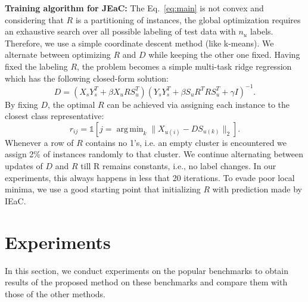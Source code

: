 \documentclass[letterpaper]{article}
\DeclareMathOperator*{\argmin}{arg\,min}
\begin{document}
\textbf{Training algorithm for JEaC: }
The Eq.~\eqref{eq:main} is not convex and considering that $R$ is a partitioning of instances, the global optimization requires an
exhaustive search over all possible labeling of test data with $n_u$ labels. Therefore, we use a simple coordinate descent
method (like k-means). We alternate between optimizing $R$ and $D$ while keeping the other one fixed.
Having fixed the labeling $R$, the problem becomes a simple multi-task ridge regression which has the following closed-form solution:
\begin{equation} \label{eq:d_update}
  D = (X_s Y_s^T + \beta X_u R S_u^T) (Y_s Y_s^T + \beta S_u R^T R S_u^T  + \gamma I)^{-1}.
\end{equation}
By fixing $D$, the optimal $R$ can be achieved via assigning each instance to the closest class representative:
\begin{equation} \label{eq:r_update}
  r_{ij} = \mathds{1}[j = \argmin_{k} \lVert X_{u(i)} - D S_{u(k)} \rVert_2 ].
\end{equation}
Whenever a row of $R$ contains no 1's, i.e.  an empty cluster is encountered we assign 2\% of instances randomly to that cluster.
We continue alternating between updates of $D$ and $R$ till R remains constants, i.e., no label changes. In our experiments, this always happens
in less that 20 iterations.
To evade poor local minima, we use a good starting point that initializing $R$ with prediction made by IEaC.

%
%
\section{Experiments} \label{experiments}

In this section, we conduct experiments on the popular benchmarks to obtain results of the proposed method on these benchmarks and compare them
 with those of the other methods.
\end{document}
